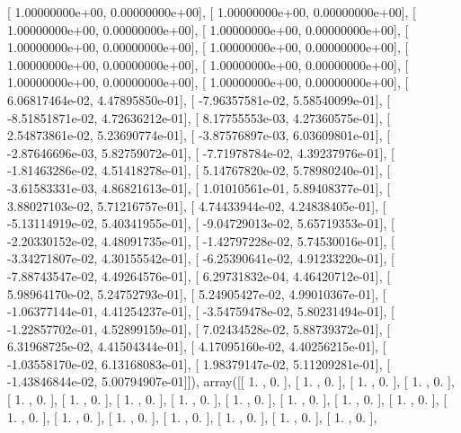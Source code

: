 \documentclass{article}
\begin{document}
       [  1.00000000e+00,   0.00000000e+00],
       [  1.00000000e+00,   0.00000000e+00],
       [  1.00000000e+00,   0.00000000e+00],
       [  1.00000000e+00,   0.00000000e+00],
       [  1.00000000e+00,   0.00000000e+00],
       [  1.00000000e+00,   0.00000000e+00],
       [  1.00000000e+00,   0.00000000e+00],
       [  1.00000000e+00,   0.00000000e+00],
       [  1.00000000e+00,   0.00000000e+00],
       [  1.00000000e+00,   0.00000000e+00],
       [  6.06817464e-02,   4.47895850e-01],
       [ -7.96357581e-02,   5.58540099e-01],
       [ -8.51851871e-02,   4.72636212e-01],
       [  8.17755553e-03,   4.27360575e-01],
       [  2.54873861e-02,   5.23690774e-01],
       [ -3.87576897e-03,   6.03609801e-01],
       [ -2.87646696e-03,   5.82759072e-01],
       [ -7.71978784e-02,   4.39237976e-01],
       [ -1.81463286e-02,   4.51418278e-01],
       [  5.14767820e-02,   5.78980240e-01],
       [ -3.61583331e-03,   4.86821613e-01],
       [  1.01010561e-01,   5.89408377e-01],
       [  3.88027103e-02,   5.71216757e-01],
       [  4.74433944e-02,   4.24838405e-01],
       [ -5.13114919e-02,   5.40341955e-01],
       [ -9.04729013e-02,   5.65719353e-01],
       [ -2.20330152e-02,   4.48091735e-01],
       [ -1.42797228e-02,   5.74530016e-01],
       [ -3.34271807e-02,   4.30155542e-01],
       [ -6.25390641e-02,   4.91233220e-01],
       [ -7.88743547e-02,   4.49264576e-01],
       [  6.29731832e-04,   4.46420712e-01],
       [  5.98964170e-02,   5.24752793e-01],
       [  5.24905427e-02,   4.99010367e-01],
       [ -1.06377144e-01,   4.41254237e-01],
       [ -3.54759478e-02,   5.80231494e-01],
       [ -1.22857702e-01,   4.52899159e-01],
       [  7.02434528e-02,   5.88739372e-01],
       [  6.31968725e-02,   4.41504344e-01],
       [  4.17095160e-02,   4.40256215e-01],
       [ -1.03558170e-02,   6.13168083e-01],
       [  1.98379147e-02,   5.11209281e-01],
       [ -1.43846844e-02,   5.00794907e-01]]), array([[ 1.        ,  0.        ],
       [ 1.        ,  0.        ],
       [ 1.        ,  0.        ],
       [ 1.        ,  0.        ],
       [ 1.        ,  0.        ],
       [ 1.        ,  0.        ],
       [ 1.        ,  0.        ],
       [ 1.        ,  0.        ],
       [ 1.        ,  0.        ],
       [ 1.        ,  0.        ],
       [ 1.        ,  0.        ],
       [ 1.        ,  0.        ],
       [ 1.        ,  0.        ],
       [ 1.        ,  0.        ],
       [ 1.        ,  0.        ],
       [ 1.        ,  0.        ],
       [ 1.        ,  0.        ],
       [ 1.        ,  0.        ],
       [ 1.        ,  0.        ],
\end{document}
